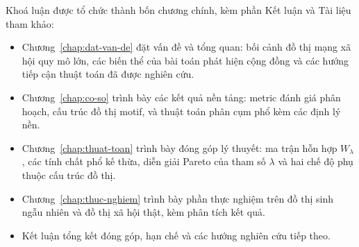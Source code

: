 
\clearpage
Khoá luận được tổ chức thành bốn chương chính, kèm phần Kết luận và Tài liệu tham khảo:
\begin{itemize}
    \item Chương~\ref{chap:dat-van-de} đặt vấn đề và tổng quan: bối cảnh đồ thị mạng xã hội quy mô lớn, các biến thể của bài toán phát hiện cộng đồng và các hướng tiếp cận thuật toán đã được nghiên cứu.
    \item Chương~\ref{chap:co-so} trình bày các kết quả nền tảng: metric đánh giá phân hoạch, cấu trúc đồ thị motif, và thuật toán phân cụm phổ kèm các định lý nền.
    \item Chương~\ref{chap:thuat-toan} trình bày đóng góp lý thuyết: ma trận hỗn hợp $W_\lambda$, các tính chất phổ kế thừa, diễn giải Pareto của tham số $\lambda$ và hai chế độ phụ thuộc cấu trúc đồ thị.
    \item Chương~\ref{chap:thuc-nghiem} trình bày phần thực nghiệm trên đồ thị sinh ngẫu nhiên và đồ thị xã hội thật, kèm phân tích kết quả.
    \item Kết luận tổng kết đóng góp, hạn chế và các hướng nghiên cứu tiếp theo.
\end{itemize}

\cleardoublepage
